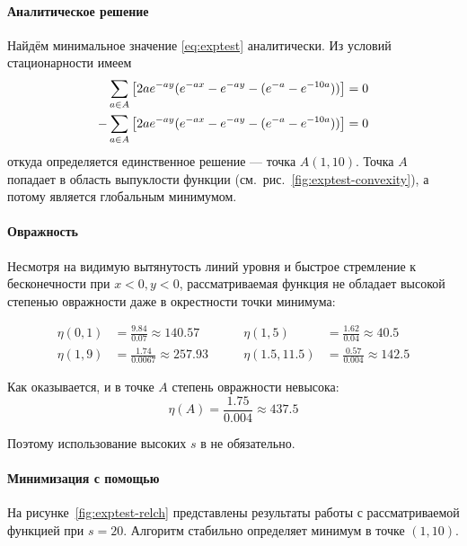 \paragraph{Аналитическое решение}

Найдём минимальное значение \eqref{eq:exptest} аналитически. Из
условий стационарности имеем
\begin{equation*}
  \begin{aligned}
    &\sum\limits_{a\in A}\left[2ae^{-ay}(e^{-ax}-e^{-ay}-(e^{-a}-e^{-10a}))\right] = 0\\
    -&\sum\limits_{a\in A}\left[2ae^{-ay}(e^{-ax}-e^{-ay}-(e^{-a}-e^{-10a}))\right] = 0
  \end{aligned}
\end{equation*}
откуда определяется единственное решение — точка $A (1,10)$. Точка $A$
попадает в область выпуклости функции
(см. рис. \ref{fig:exptest-convexity}), а потому является глобальным
минимумом.

\paragraph{Овражность}

Несмотря на видимую вытянутость линий уровня и быстрое стремление к
бесконечности при $x<0,y<0$, рассматриваемая функция не обладает
высокой степенью овражности даже в окрестности точки минимума:

\begin{equation}
  \begin{aligned}
    \eta(0,1) &= \frac{9.84}{0.07} \approx 140.57&\qquad
    \eta(1,5) &= \frac{1.62}{0.04} \approx 40.5\\
    \eta(1,9) &= \frac{1.74}{0.0067} \approx 257.93&\qquad
    \eta(1.5,11.5) &= \frac{0.57}{0.004} \approx 142.5
\end{aligned}
\end{equation}

Как оказывается, и в точке $A$ степень овражности невысока:
\begin{equation*}
  \eta(A) = \frac{1.75}{0.004} \approx 437.5
\end{equation*}

Поэтому использование высоких $s$ в \relch{} не обязательно.

\paragraph{Минимизация с помощью \relch{}}

На рисунке \ref{fig:exptest-relch} представлены результаты работы
\relch{} с рассматриваемой функцией при $s=20$. Алгоритм стабильно
определяет минимум в точке $(1, 10)$.

